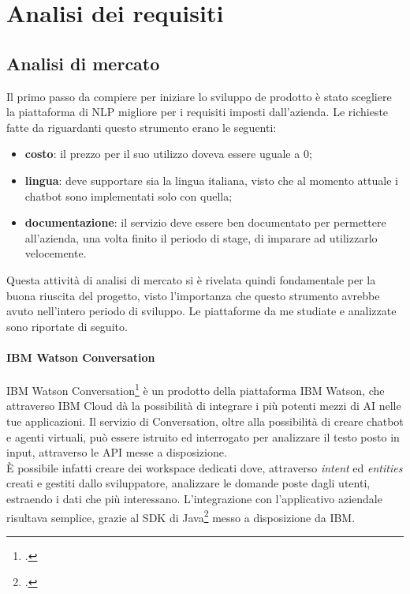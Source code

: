 
\chapter{Analisi dei requisiti}
\label{cap:analisi}

\section{Analisi di mercato}
Il primo passo da compiere per iniziare lo sviluppo de prodotto è stato scegliere la piattaforma di \gls{NLP} migliore per i requisiti imposti dall'azienda. Le richieste fatte da \azienda{} riguardanti questo strumento erano le seguenti:
\begin{itemize}
	\item \textbf{costo}: il prezzo per il suo utilizzo doveva essere uguale a 0;
	\item \textbf{lingua}: deve supportare sia la lingua italiana, visto che al momento attuale i \gls{chatbot} sono implementati solo con quella;
	\item \textbf{documentazione}: il servizio deve essere ben documentato per permettere all'azienda, una volta finito il periodo di stage, di imparare ad utilizzarlo velocemente.
\end{itemize}

Questa attività di analisi di mercato si è rivelata quindi fondamentale per la buona riuscita del progetto, visto l'importanza che questo strumento avrebbe avuto nell'intero periodo di sviluppo. Le piattaforme da me studiate e analizzate sono riportate di seguito.

\subsubsection{IBM Watson Conversation}
IBM Watson Conversation\footcite{watson} è un prodotto della piattaforma IBM Watson, che attraverso IBM Cloud dà la possibilità di integrare i più potenti mezzi di AI nelle tue applicazioni. Il servizio di Conversation, oltre alla possibilità di creare \gls{chatbot} e agenti virtuali, può essere istruito ed interrogato per analizzare il testo posto in input, attraverso le \gls{API} messe a disposizione.\\
È possibile infatti creare dei workspace dedicati dove, attraverso \emph{intent} ed \emph{entities} creati e gestiti dallo sviluppatore, analizzare le domande poste dagli utenti, estraendo i dati che più interessano. L'integrazione con l'applicativo aziendale risultava semplice, grazie al SDK di Java\footcite{watsonSDK} messo a disposizione da IBM.

